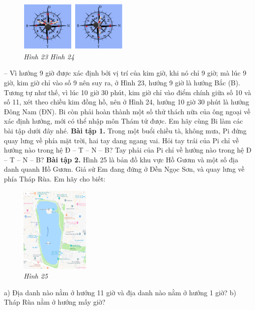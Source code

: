 	\begin{figure}[H]
		\centering
		\vspace*{-5pt}
		\captionsetup{labelformat= empty, justification=centering}
		\includegraphics[width=0.48\textwidth]{pic19}
		\caption{\small\textit{Hình 23 \hspace*{80pt} Hình 24}}
		\vspace*{-15pt}
	\end{figure}
	-- Vì hướng 9 giờ được xác định bởi vị trí của kim giờ, khi nó chỉ 9 giờ; mà lúc 9 giờ, kim giờ chỉ vào số 9 nên suy ra, ở Hình 23, hướng 9 giờ là hướng Bắc (B). Tương tự như thế, vì lúc 10 giờ 30 phút, kim giờ chỉ vào điểm chính giữa số 10 và số 11, xét theo chiều kim đồng hồ, nên ở Hình 24, hướng 10 giờ 30 phút là hướng Đông Nam (ĐN).
	\vskip 0.1cm
	Bi còn phải hoàn thành một số thử thách nữa của ông ngoại về xác định hướng, mới có thể nhập môn Thám tử được. Em hãy cùng Bi làm các bài tập dưới đây nhé.
	\vskip 0.1cm
	\textbf{Bài tập 1.} Trong một buổi chiều tà, không mưa, Pi đứng quay lưng về phía mặt trời, hai tay dang ngang vai. Hỏi tay trái của Pi chỉ về hướng nào trong hệ Đ -- T -- N -- B? Tay phải của Pi chỉ về hướng nào trong hệ Đ -- T -- N -- B?
	\vskip 0.1cm
	\textbf{Bài tập 2.} Hình 25 là bản đồ khu vực Hồ Gươm và một số địa danh quanh Hồ Gươm. Giả sử Em đang đứng ở Đền Ngọc Sơn, và quay lưng về phía Tháp Rùa. Em hãy cho biết:
	\begin{figure}[H]
		\centering
		\vspace*{-5pt}
		\captionsetup{labelformat= empty, justification=centering}
		\includegraphics[width=0.3\textwidth]{pic25}
		\caption{\small\textit{Hình 25}}
		\vspace*{-5pt}
	\end{figure}
	a) Địa danh nào nằm ở hướng 11 giờ và địa danh nào nằm ở hướng 1 giờ?
	\vskip 0.1cm
	b) Tháp Rùa nằm ở hướng mấy giờ?

